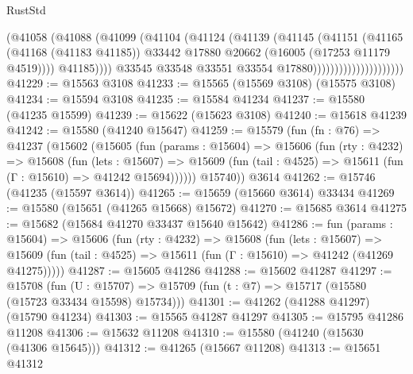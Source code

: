\begin{lexlean}{RustStd}
\begin{coremodule}
                                        (@41058
                                          (@41088
                                            (@41099
                                              (@41104
                                                (@41124
                                                  (@41139
                                                    (@41145
                                                      (@41151
                                                        (@41165
                                                          (@41168 (@41183 @41185))
                                                          @33442
                                                          @17880
                                                          @20662
                                                          (@16005 (@17253 @11179 @4519))))
                                                      @41185))))
                                              @33545
                                              @33548
                                              @33551
                                              @33554
                                              @17880)))))))))))))))))))))
@41229 := @15563 @3108
@41233 := @15565 (@15569 @3108) (@15575 @3108)
@41234 := @15594 @3108
@41235 := @15584 @41234
@41237 := @15580 (@41235 @15599)
@41239 := @15622 (@15623 @3108)
@41240 := @15618 @41239
@41242 := @15580 (@41240 @15647)
@41259 := @15579
    (fun (fn : @76) =>
    @41237
      (@15602
        (@15605
          (fun (params : @15604) =>
          @15606
            (fun (rty : @4232) =>
            @15608
              (fun (lets : @15607) =>
              @15609 (fun (tail : @4525) => @15611 (fun (Γ : @15610) => @41242 @15694))))))
        @15740))
    @3614
@41262 := @15746 (@41235 (@15597 @3614))
@41265 := @15659 (@15660 @3614) @33434
@41269 := @15580 (@15651 (@41265 @15668) @15672)
@41270 := @15685 @3614
@41275 := @15682 (@15684 @41270 @33437 @15640 @15642)
@41286 := fun (params : @15604) =>
  @15606
    (fun (rty : @4232) =>
    @15608
      (fun (lets : @15607) =>
      @15609 (fun (tail : @4525) => @15611 (fun (Γ : @15610) => @41242 (@41269 @41275)))))
@41287 := @15605 @41286
@41288 := @15602 @41287
@41297 := @15708
    (fun (U : @15707) => @15709 (fun (t : @7) => @15717 (@15580 (@15723 @33434 @15598) @15734)))
@41301 := @41262 (@41288 @41297) (@15790 @41234)
@41303 := @15565 @41287 @41297
@41305 := @15795 @41286 @11208
@41306 := @15632 @11208
@41310 := @15580 (@41240 (@15630 (@41306 @15645)))
@41312 := @41265 (@15667 @11208)
@41313 := @15651 @41312

\end{coremodule}
\end{lexlean}
